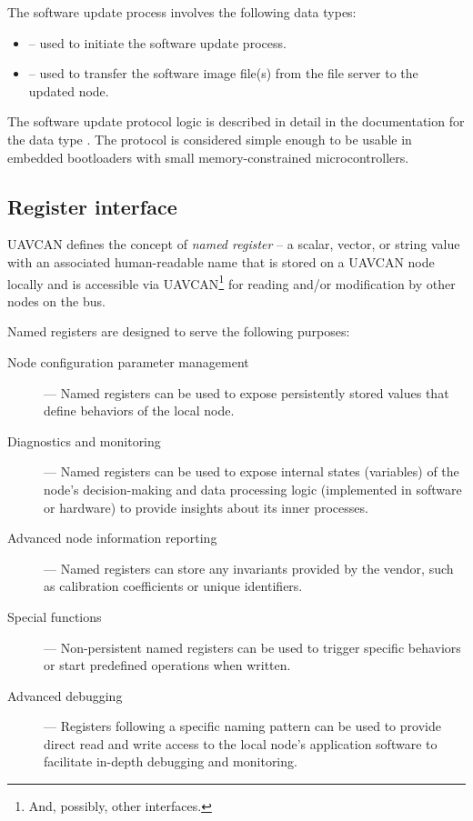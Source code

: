 The software update process involves the following data types:

\begin{itemize}
    \item {} -- used to initiate the software update process.
    \item {} -- used to transfer the software image file(s)
          from the file server to the updated node.
\end{itemize}

The software update protocol logic is described in detail in the documentation for the data type
.
The protocol is considered simple enough to be usable in embedded bootloaders with
small memory-constrained microcontrollers.

\subsection{Register interface}\label{sec:application_register_interface}

UAVCAN defines the concept of \emph{named register} -- a scalar, vector, or string value with an associated
human-readable name that is stored on a UAVCAN node locally and is accessible via
UAVCAN\footnote{And, possibly, other interfaces.} for reading and/or modification
by other nodes on the bus.

Named registers are designed to serve the following purposes:
\begin{description}
    \item[Node configuration parameter management] --- Named registers can be used to expose persistently stored
          values that define behaviors of the local node.

    \item[Diagnostics and monitoring] --- Named registers can be used to expose internal states (variables) of
          the node's decision-making and data processing logic (implemented in software or hardware) to provide
          insights about its inner processes.

    \item[Advanced node information reporting] --- Named registers can store any invariants provided by the vendor,
          such as calibration coefficients or unique identifiers.

    \item[Special functions] --- Non-persistent named registers can be used to trigger specific behaviors or
          start predefined operations when written.

    \item[Advanced debugging] --- Registers following a specific naming pattern can be used to provide direct read
          and write access to the local node's application software to facilitate in-depth debugging and monitoring.
\end{description}

